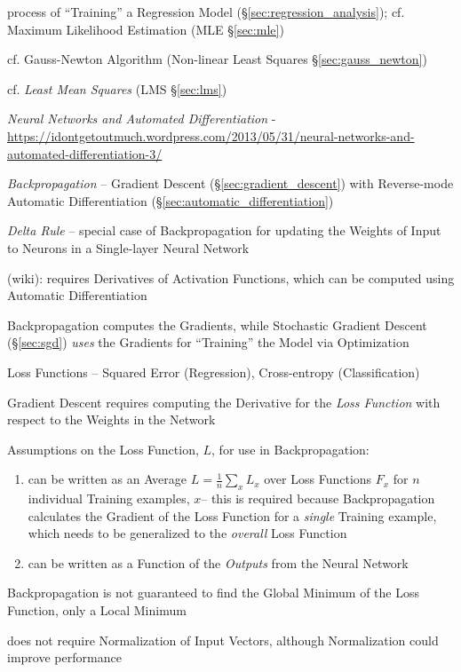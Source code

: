 process of ``Training'' a Regression Model (\S\ref{sec:regression_analysis});
cf. Maximum Likelihood Estimation (MLE \S\ref{sec:mle})

cf. Gauss-Newton Algorithm (Non-linear Least Squares \S\ref{sec:gauss_newton})

cf. \emph{Least Mean Squares} (LMS \S\ref{sec:lms})

\emph{Neural Networks and Automated Differentiation} -
\url{https://idontgetoutmuch.wordpress.com/2013/05/31/neural-networks-and-automated-differentiation-3/}

\emph{Backpropagation} -- Gradient Descent (\S\ref{sec:gradient_descent}) with
Reverse-mode Automatic Differentiation (\S\ref{sec:automatic_differentiation})

\emph{Delta Rule} -- special case of Backpropagation for updating the Weights of
Input to Neurons in a Single-layer Neural Network

(wiki): requires Derivatives of Activation Functions, which can be computed
using Automatic Differentiation

Backpropagation computes the Gradients, while Stochastic Gradient Descent
(\S\ref{sec:sgd}) \emph{uses} the Gradients for ``Training'' the Model via
Optimization

Loss Functions -- Squared Error (Regression), Cross-entropy (Classification)

Gradient Descent requires computing the Derivative for the \emph{Loss Function}
with respect to the Weights in the Network

Assumptions on the Loss Function, $L$, for use in Backpropagation:
\begin{enumerate}
  \item can be written as an Average $L = \frac{1}{n} \sum_x L_x$ over Loss
    Functions $F_x$ for $n$ individual Training examples, $x$-- this is required
    because Backpropagation calculates the Gradient of the Loss Function for a
    \emph{single} Training example, which needs to be generalized to the
    \emph{overall} Loss Function
  \item can be written as a Function of the \emph{Outputs} from the Neural
    Network
\end{enumerate}

Backpropagation is not guaranteed to find the Global Minimum of the Loss
Function, only a Local Minimum

does not require Normalization of Input Vectors, although Normalization could
improve performance

